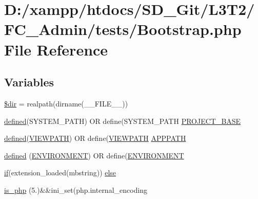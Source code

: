 \hypertarget{_admin_2tests_2_bootstrap_8php}{}\section{D\+:/xampp/htdocs/\+S\+D\+\_\+\+Git/\+L3\+T2/\+F\+C\+\_\+\+Admin/tests/\+Bootstrap.php File Reference}
\label{_admin_2tests_2_bootstrap_8php}
\subsection*{Variables}
\begin{DoxyCompactItemize}
\item 
\hyperlink{_admin_2tests_2_bootstrap_8php_a1659f0a629d408e0f849dbe4ee061e62}{\$dir} = realpath(dirname(\+\_\+\+\_\+\+F\+I\+L\+E\+\_\+\+\_\+))
\item 
\hyperlink{_admin_2tests_2_bootstrap_8php_a46458e8654a714e0565e20f63021add9}{defined}(\textquotesingle{}S\+Y\+S\+T\+E\+M\+\_\+\+P\+A\+T\+H\textquotesingle{}) O\+R define(\textquotesingle{}S\+Y\+S\+T\+E\+M\+\_\+\+P\+A\+T\+H\textquotesingle{} \hyperlink{_admin_2tests_2_bootstrap_8php_a8731a5d504a6592ae43e07a048933c32}{P\+R\+O\+J\+E\+C\+T\+\_\+\+B\+A\+S\+E}
\item 
\hyperlink{_admin_2tests_2_bootstrap_8php_a46458e8654a714e0565e20f63021add9}{defined}(\textquotesingle{}\hyperlink{_admin_2index_8php_ade8921d52af58583e5727833459224c3}{V\+I\+E\+W\+P\+A\+T\+H}\textquotesingle{}) O\+R define(\textquotesingle{}\hyperlink{_admin_2index_8php_ade8921d52af58583e5727833459224c3}{V\+I\+E\+W\+P\+A\+T\+H}\textquotesingle{} \hyperlink{_admin_2tests_2_bootstrap_8php_a45cc636071e9edf22e5709d3c18bc84f}{A\+P\+P\+P\+A\+T\+H}
\item 
\hyperlink{_admin_2tests_2_bootstrap_8php_a46458e8654a714e0565e20f63021add9}{defined} (\textquotesingle{}\hyperlink{_admin_2index_8php_a8757a57d09df5349f8b93b2083e29a1e}{E\+N\+V\+I\+R\+O\+N\+M\+E\+N\+T}\textquotesingle{}) O\+R define(\textquotesingle{}\hyperlink{_admin_2index_8php_a8757a57d09df5349f8b93b2083e29a1e}{E\+N\+V\+I\+R\+O\+N\+M\+E\+N\+T}\textquotesingle{}
\item 
\hyperlink{_admin_2assets_2js_2bootstrap_8min_8js_a87cf461060832b8b68a7b48d9e371e4f}{if}(extension\+\_\+loaded(\textquotesingle{}mbstring\textquotesingle{})) \hyperlink{_admin_2tests_2_bootstrap_8php_a67773d041d277deb84668d80e4099034}{else}
\item 
\hyperlink{_admin_2tests_2_bootstrap_8php_acbea7ca989439eea4c6019ad3c5161aa}{is\+\_\+php} (\textquotesingle{}5.\textquotesingle{})\&\&ini\+\_\+set(\textquotesingle{}php.\+internal\+\_\+encoding\textquotesingle{}
\end{DoxyCompactItemize}


